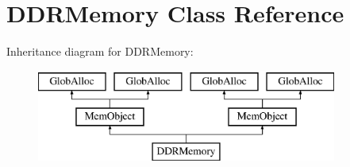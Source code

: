 \hypertarget{classDDRMemory}{\section{D\-D\-R\-Memory Class Reference}
\label{classDDRMemory}
}
Inheritance diagram for D\-D\-R\-Memory\-:\begin{figure}[H]
\begin{center}
\leavevmode
\includegraphics[height=3.000000cm]{classDDRMemory}
\end{center}
\end{figure}
